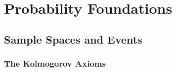 %
%

%
%
\chapter{Probability Foundations}         %
\section{Sample Spaces and Events}        %
\subsection{The Kolmogorov Axioms}        %

